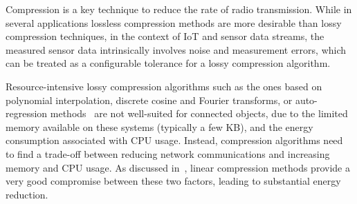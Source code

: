 Compression is a key technique to reduce the rate of radio 
transmission.  While in several applications lossless compression 
methods are more desirable than lossy compression techniques, in the 
context of IoT and sensor data streams, the measured sensor data 
intrinsically involves noise and measurement errors, which can 
be treated as a configurable tolerance for a lossy compression algorithm. 

Resource-intensive lossy compression algorithms such as the ones based on 
polynomial interpolation, discrete cosine and Fourier transforms, or 
auto-regression methods~\cite{lu2010optimized} are not well-suited for 
connected objects, due to the limited memory available on 
these systems (typically a few KB), and the energy consumption 
associated with CPU usage. Instead, compression algorithms need 
to find a trade-off between reducing network communications and 
increasing memory and CPU usage. As 
discussed in~\cite{zordan2014performance}, linear compression methods 
provide a very good compromise between these two factors, leading to 
substantial energy reduction.
